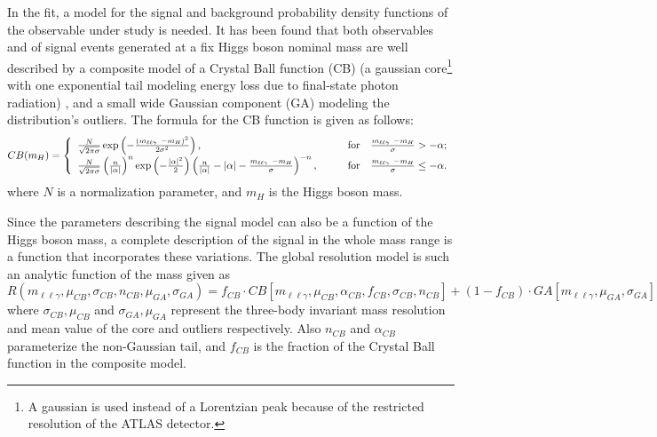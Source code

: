 In the fit, a model for the signal and background probability density functions of
the observable under study is needed. It has been found that both observables
\mllg and \dm of signal events generated at a fix Higgs boson nominal mass are
well described by a composite model of a Crystal Ball function (CB) (a gaussian
core\footnote{A gaussian is used instead of a Lorentzian peak because of the
restricted resolution of the ATLAS detector.} 
with one exponential tail modeling energy loss due to final-state photon
radiation) \cite{Oreglia}, 
and a small wide Gaussian component (GA) modeling the distribution's outliers.
The formula for the CB function is given as follows:
\begin{displaymath}
    CB(m_H) = \left\{
            \begin{array}{lr}
            \frac{N}{\sqrt{2 \pi \sigma}} \exp\left(-\frac{(\mllg-m_H)^2}{2\sigma^2}\right), & \qquad \mathrm{for}\quad \frac{\mllg-m_H}{\sigma} > -\alpha; \\
            \frac{N}{\sqrt{2\pi\sigma}} \left(\frac{n}{|\alpha|}\right)^n \exp\left(-\frac{|\alpha|^2}{2}\right)\left(\frac{n}{|\alpha|} - |\alpha| - \frac{\mllg - m_H}{\sigma}\right)^{-n}, & \qquad \mathrm{for}\quad \frac{\mllg-m_H}{\sigma} \le -\alpha.
            \end{array}
               \right.
\end{displaymath}
where $N$ is a normalization parameter, and $m_H$ is the Higgs boson mass.

Since the parameters describing the signal model can also be a function
of the Higgs boson mass, a complete description of the signal in the whole
mass range is a function that incorporates these variations. The global
resolution model is such an analytic function of the mass given as
\[
    R(m_{\ell\ell\gamma}, \mu_{CB}, \sigma_{CB}, n_{CB}, \mu_{GA}, \sigma_{GA}) =
    f_{CB} \cdot CB\left[m_{\ell\ell\gamma}, \mu_{CB}, \alpha_{CB}, f_{CB},
    \sigma_{CB}, n_{CB}\right] + (1 - f_{CB}) \cdot
    GA\left[m_{\ell\ell\gamma}, \mu_{GA}, \sigma_{GA}\right]
\]
where $\sigma_{CB}, \mu_{CB}$ and $\sigma_{GA}, \mu_{GA}$ represent the
three-body invariant mass resolution and mean value of the core and outliers
respectively. Also $n_{CB}$ and $\alpha_{CB}$ parameterize the non-Gaussian tail, and
$f_{CB}$ is the fraction of the Crystal Ball function in the composite model.

